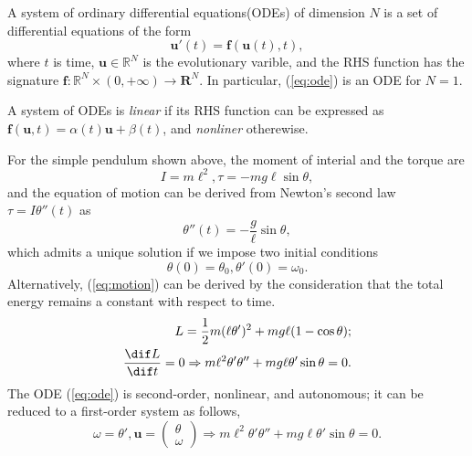 \begin{defn}
  A system of ordinary differential equations(ODEs)
  of dimension $N$ is a set of differential equations of the form
  \begin{equation}
    \label{eq:ode}
    \mathbf{u}'(t) = \mathbf{f}(\mathbf{u}(t),t),
  \end{equation}
  where $t$ is time,
  $\mathbf{u}\in \mathbb{R}^N$ is the evolutionary varible,
  and the RHS function has the signature
  $\mathbf{f}:\mathbb{R}^N\times (0,+\infty)\rightarrow \mathbf{R}^N$.
  In particular, (\ref{eq:ode}) is an ODE for $N=1$.
\end{defn}

\begin{defn}
  A system of ODEs is \emph{linear} if its RHS function can be
  expressed as
  $\mathbf{f}(\mathbf{u},t)=\alpha(t)\mathbf{u}+\beta(t)$,
  and \emph{nonliner} otherewise.
\end{defn}

\begin{exm}
  For the simple pendulum shown above,
  the moment of interial and the torque are
  \begin{displaymath}
    I=m\ell^2,\tau=-mg\ell\sin \theta,
  \end{displaymath}
  and the equation of motion can be derived from Newton's second
  law $\tau=I\theta''(t)$ as
  \begin{equation}\label{eq:motion}
    \theta''(t)=-\frac{g}{\ell}\sin\theta,
  \end{equation}
  which admits a unique solution if we impose two initial conditions
  \begin{displaymath}
    \theta(0)=\theta_0,\theta'(0)=\omega_0.
  \end{displaymath}
  Alternatively, (\ref{eq:motion}) can be derived by the consideration
  that the total energy remains a constant with respect to time.
  \begin{displaymath}
    \begin{aligned}
      L=\frac{1}{2}m(\ell\theta')^2+mg\ell(1-\cos\theta);\\
      \frac{\dif L}{\dif t}= 0\Rightarrow m\ell^2\theta'\theta''
      +mg\ell \theta'\sin \theta=0.
    \end{aligned}
  \end{displaymath}
  The ODE (\ref{eq:ode}) is second-order, nonlinear, and autonomous;
  it can be reduced to a first-order system as follows,
  \begin{displaymath}
    \omega =\theta',\mathbf{u}=
    \begin{pmatrix}
      \theta\\
      \omega
    \end{pmatrix}
    \Rightarrow m\ell^2\theta'\theta''+mg\ell\theta'\sin\theta =0.
  \end{displaymath}
\end{exm}


